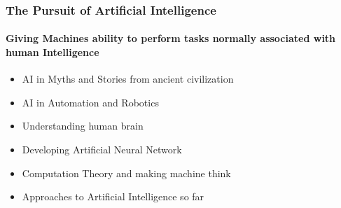 \documentclass{beamer}
\begin{document}
\begin{frame}
  \frametitle{The Pursuit of Artificial Intelligence}
  \framesubtitle{Giving Machines ability to perform tasks normally associated with human Intelligence}

  \begin{itemize}
    \item AI in Myths and Stories from ancient civilization
    \item AI in Automation and Robotics
    \item Understanding human brain
    \item Developing Artificial Neural Network
    \item Computation Theory and making machine think
    \item Approaches to Artificial Intelligence so far
  \end{itemize}

\end{frame}
\end{document}
